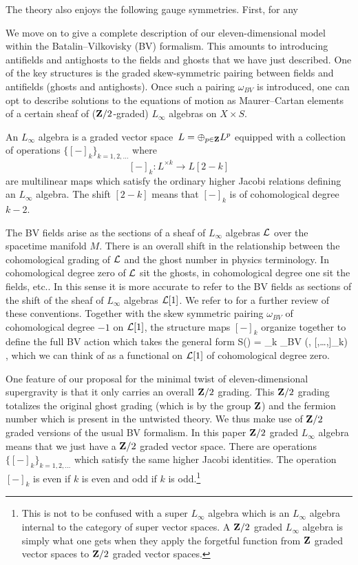 \documentclass[11pt]{amsart}%
\begin{document}
The theory also enjoys the following gauge symmetries.
First, for any 


\parsec[s:Lsugra]

We move on to give a complete description of our eleven-dimensional model within the Batalin--Vilkovisky (BV) formalism.
This amounts to introducing antifields and antighosts to the fields and ghosts that we have just described.
One of the key structures is the graded skew-symmetric pairing between fields and antifields (ghosts and antighosts).
Once such a pairing $\omega_{BV}$ is introduced, one can opt to describe solutions to the equations of motion as Maurer--Cartan elements of a certain sheaf of ($\mathbf{Z}/2$-graded) $L_\infty$ algebras on $X \times S$.

An $L_\infty$ algebra is a graded vector space~$L=\oplus_{p\in \mathbf{Z}} L^p$ equipped with a collection of operations $\{[-]_k\}_{k = 1,2,\ldots}$ where 
\[
[-]_k \colon L^{\times k} \to L[2-k] 
\]
are multilinear maps which satisfy the ordinary higher Jacobi relations defining an $L_\infty$ algebra.
The shift $[2-k]$ means that $[-]_k$ is of cohomological degree $k-2$. 

The BV fields arise as the sections of a sheaf of $L_\infty$ algebras $\mathcal L$ over the spacetime manifold $M$.
There is an overall shift in the relationship between the cohomological grading of $\mathcal L$ and the ghost number in physics terminology. 
In cohomological degree zero of $\mathcal L$ sit the ghosts, in cohomological degree one sit the fields, etc..
In this sense it is more accurate to refer to the BV fields as sections of the shift of the sheaf of $L_\infty$ algebras $\mathcal L[1]$. 
We refer to \cite{CG2,ESW} for a further review of these conventions.
Together with the skew symmetric pairing $\omega_{BV}$ of cohomological degree $-1$ on $\mathcal L[1]$, the structure maps $[-]_k$ organize together to define the full BV action which takes the general form
\beqn
\label{eqn:Sbv}
S(\Phi) = \sum_{k } \omega_{BV} \left(\Phi , [\Phi,\ldots,\Phi]_{k}\right) ,
\eeqn
which we can think of as a functional on $\mathcal L[1]$ of cohomological degree zero.

One feature of our proposal for the minimal twist of eleven-dimensional supergravity is that it only carries an overall $\mathbf{Z}/2$ grading. 
This $\mathbf{Z}/2$ grading totalizes the original ghost grading (which is by the group $\mathbf{Z}$) and the fermion number which is present in the untwisted theory.
We thus make use of $\mathbf{Z}/2$ graded versions of the usual BV formalism.
In this paper $\mathbf{Z}/2$ graded $L_\infty$ algebra means that we just have a $\mathbf{Z}/2$ graded vector space.
There are operations $\{[-]_k\}_{k = 1,2,\ldots}$ which satisfy the same higher Jacobi identities.
The operation $[-]_k$ is even if $k$ is even and odd if $k$ is odd.\footnote{This is not to be confused with a super $L_\infty$ algebra which is an $L_\infty$ algebra internal to the category of super vector spaces.
A $\mathbf{Z}/2$ graded $L_\infty$ algebra is simply what one gets when they apply the forgetful function from $\mathbf{Z}$ graded vector spaces to $\mathbf{Z}/2$ graded vector spaces.}
\end{document}
